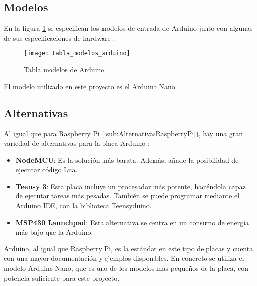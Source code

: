 
        \subsection{Modelos} %
        \label{sub:ModelosArduino}

            En la figura \ref{fig:ImagenModelosArduino} se especifican los modelos de entrada de Arduino junto con
            algunas de sus especificaciones de hardware \cite{arduino_compare}:

            \begin{figure}[ht]
                \centering
                \texttt{[image: tabla\_modelos\_arduino]}
                \caption{Tabla modelos de Arduino \cite{arduino_compare}\label{fig:ImagenModelosArduino}}
            \end{figure}

            El modelo utilizado en este proyecto es el Arduino Nano.


        \subsection{Alternativas} %
        \label{sub:AlternativasArduino}

            Al igual que para Raspberry Pi (\ref{sub:AlternativasRaspberryPi}), hay una gran variedad de alternativas
            para la placa Arduino \cite{alternativas_arduino}:

            \begin{itemize}
                \item \textbf{NodeMCU}: Es la solución más barata. Además, añade la posibilidad de ejecutar código Lua.
                \item \textbf{Teensy 3}: Esta placa incluye un procesador más potente, haciéndola capaz de ejecutar
                tareas más pesadas. También se puede programar mediante el Arduino IDE, con la biblioteca Teensyduino.
                \item \textbf{MSP430 Launchpad}: Esta alternativa se centra en un consumo de energía más bajo que la
                Arduino.
            \end{itemize}

            Arduino, al igual que Raspberry Pi, es la estándar en este tipo de placas y cuenta con una mayor
            documentación y ejemplos disponibles. En concreto se utiliza el modelo Arduino Nano, que es uno de los
            modelos más pequeños de la placa, con potencia suficiente para este proyecto.

